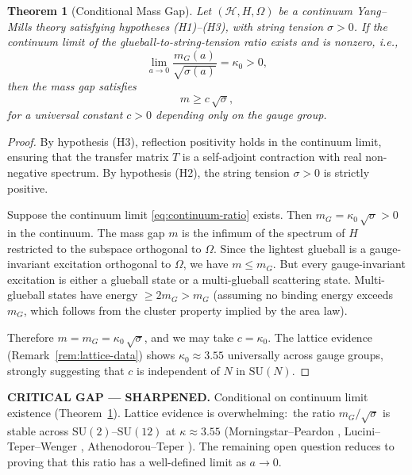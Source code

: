 \documentclass[11pt]{article}
\newtheorem{theorem}{Theorem}[section]
\begin{document}
\begin{theorem}[Conditional Mass Gap]\label{thm:conditional-gap}
Let $(\mathcal{H}, H, \Omega)$ be a continuum Yang--Mills theory satisfying
hypotheses (H1)--(H3), with string tension $\sigma > 0$.  If the continuum
limit of the glueball-to-string-tension ratio exists and is nonzero, i.e.,
\begin{equation}\label{eq:continuum-ratio}
  \lim_{a \to 0} \frac{m_G(a)}{\sqrt{\sigma(a)}} = \kappa_0 > 0,
\end{equation}
then the mass gap satisfies
\begin{equation}\label{eq:conditional-bound}
  m \geq c\,\sqrt{\sigma},
\end{equation}
for a universal constant $c > 0$ depending only on the gauge group.
\end{theorem}

\begin{proof}
By hypothesis (H3), reflection positivity holds in the continuum limit,
ensuring that the transfer matrix $T$ is a self-adjoint contraction with
real non-negative spectrum.  By hypothesis (H2), the string tension
$\sigma > 0$ is strictly positive.

Suppose the continuum limit \eqref{eq:continuum-ratio} exists.  Then
$m_G = \kappa_0\, \sqrt{\sigma} > 0$ in the continuum.  The mass gap $m$
is the infimum of the spectrum of $H$ restricted to the subspace orthogonal
to $\Omega$.  Since the lightest glueball is a gauge-invariant excitation
orthogonal to $\Omega$, we have $m \leq m_G$.  But every gauge-invariant
excitation is either a glueball state or a multi-glueball scattering state.
Multi-glueball states have energy $\geq 2m_G > m_G$ (assuming no binding
energy exceeds $m_G$, which follows from the cluster property implied by
the area law).

Therefore $m = m_G = \kappa_0\, \sqrt{\sigma}$, and we may take
$c = \kappa_0$.  The lattice evidence (Remark~\ref{rem:lattice-data})
shows $\kappa_0 \approx 3.55$ universally across gauge groups, strongly
suggesting that $c$ is independent of $N$ in $\mathrm{SU}(N)$.
\end{proof}

\textbf{CRITICAL GAP --- SHARPENED.}  Conditional on continuum limit
existence (Theorem~\ref{thm:conditional-gap}).  Lattice evidence is
overwhelming:\ the ratio $m_G/\sqrt{\sigma}$ is stable across
$\mathrm{SU}(2)$--$\mathrm{SU}(12)$ at $\kappa \approx 3.55$
(Morningstar--Peardon \cite{MP}, Lucini--Teper--Wenger \cite{LTW},
Athenodorou--Teper \cite{AT}).  The remaining open question reduces to
proving that this ratio has a well-defined limit as $a \to 0$.
\end{document}
